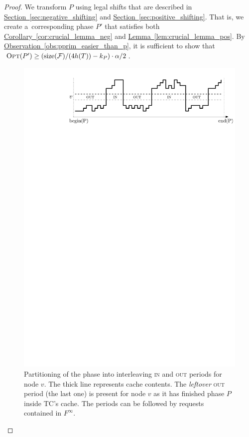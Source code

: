 \documentclass[sigconf,screen=true]{acmart}
\newcommand{\lref}[2][]{\hyperref[#2]{#1~\ref*{#2}}}
\newcommand{\ALG}{\textsc{TC}\xspace}
\newcommand{\OPT}{\textsc{Opt}\xspace}
\newcommand{\size}{\textrm{size}}
\newcommand{\F}{\mathcal{F}}
\newcommand{\pin}{\textnormal{\textsc{in}}\xspace}
\newcommand{\pout}{\textnormal{\textsc{out}}\xspace}
\begin{document}
\begin{proof}
We transform $P$ using legal shifts that are described in 
\lref[Section]{sec:negative_shifting} and
\lref[Section]{sec:positive_shifting}. That is, we create a~corresponding
phase $P'$ that satisfies both
\lref[Corollary]{cor:crucial_lemma_neg} and
\lref[Lemma]{lem:crucial_lemma_pos}. 
By \lref[Observation]{obs:pprim_easier_than_p}, it is sufficient to show that
$\OPT(P') \geq (\size(\F) / (4 h(T)) - k_P) \cdot \alpha/2$.

\begin{figure}[t]
\centering
\includegraphics[width=0.9\columnwidth,keepaspectratio]{images/leftover}
\caption{Partitioning of the phase into interleaving \pin and \pout periods
for node $v$. The thick line represents cache contents. The \emph{leftover}
\pout period (the last one) is present for node $v$ as it has finished phase
$P$ inside \ALG's cache. The periods can be followed by requests contained in
$F^\infty$.}
\label{fig:leftover}
\end{figure}


\end{proof}
\end{document}
